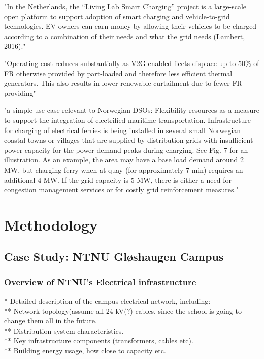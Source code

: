 "In the Netherlands, the “Living Lab Smart Charging” project is a large-scale open platform to support adoption of smart charging and vehicle-to-grid technologies. EV owners can earn money by allowing their vehicles to be charged according to a combination of their needs and what the grid needs (Lambert, 2016)." \cite{international_energy_agency_status_2017}

"Operating cost reduces substantially as V2G enabled fleets displace up to 50\% of FR otherwise provided by part-loaded and therefore less efficient thermal generators. This also results in lower renewable curtailment due to fewer FR-providing" \cite{aunedi_whole-system_2020}

"a simple use case relevant to Norwegian DSOs: Flexibility resources as a measure to support the integration of electrified maritime transportation. Infrastructure for charging of electrical ferries is being installed in several small Norwegian coastal towns or villages that are supplied by distribution grids with insufficient power capacity for the power demand peaks during charging. See Fig. 7 for an illustration. As an example, the area may have a base load demand around 2 MW, but charging ferry when at quay (for approximately 7 min) requires an additional 4 MW. If the grid capacity is 5 MW, there is either a need for congestion management services or for costly grid reinforcement measures." \cite{degefa_comprehensive_2021}



\section{Methodology}
\subsection{Case Study: NTNU Gløshaugen Campus}

\subsubsection{Overview of NTNU's Electrical infrastructure}

* Detailed description of the campus electrical network, including: \\
** Network topology(assume all 24 kV(?) cables, since the school is going to change them all in the future. \\ 
** Distribution system characteristics. \\
** Key infrastructure components (transformers, cables etc). \\
** Building energy usage, how close to capacity etc. 


